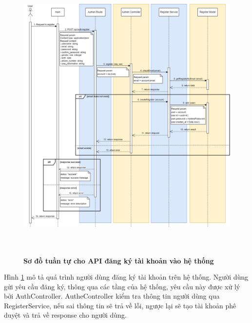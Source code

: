\begin{figure}[H]
  \centering
  \includegraphics[width=16cm,height=15cm]{Images/sequence_api/register.png}
  \caption[Sơ đồ tuần tự cho API đăng ký tài khoản vào hệ thống]{\bfseries \fontsize{12pt}{0pt}
  \selectfont Sơ đồ tuần tự cho API đăng ký tài khoản vào hệ thống }
  \label{api_register} %
\end{figure}
Hình \ref{api_register} mô tả quá trình người dùng đăng ký tài khoản trên hệ thống. Người dùng gửi yêu cầu đăng ký, thông qua các tầng của hệ thống, yêu cầu này được xử lý bởi AuthController. AutheController kiểm tra thông tin người dùng qua RegisterService, 
nếu sai thông tin sẽ trả về lỗi, ngược lại sẽ tạo tài khoản phê duyệt và trả về response cho người dùng. 

